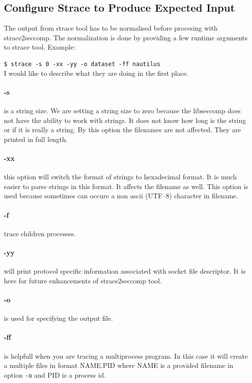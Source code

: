 \subsection{Configure Strace to Produce Expected Input}
\label{sec:strace_config}

The output from strace tool has to be normalised before procesing with strace2seccomp.
The normalization is done by providing a few runtime arguments to strace tool.
Example:

\texttt{\$ strace -s 0 -xx -yy -o dataset -ff nautilus }
\\
I would like to describe what they are doing in the first place.\cite{strace_man}

\paragraph{-s} is a string size. We are setting a string size to zero because the
libseccomp does not have the ability to work with strings. It does not know how long is
the string or if it is really a string. By this option the filenames are not affected.
They are printed in full length.

\paragraph{-xx} this option will switch the format of strings to hexadecimal format.
It is much easier to parse strings in this format. It affects the filename as well.
This option is used because sometimes can occure a non ascii (UTF--8) character in filename.

\paragraph{-f} trace children processes.

\paragraph{-yy} will print protocol specific information associated with socket file descriptor.
It is here for future enhancements of strace2seccomp tool.

\paragraph{-o} is used for specifying the output file.

\paragraph{-ff} is helpfull when you are tracing a multiprocess program.
In this case it will create a multiple files in format
NAME.PID where NAME is a provided filename in option \texttt{-o} and PID is a process id.



